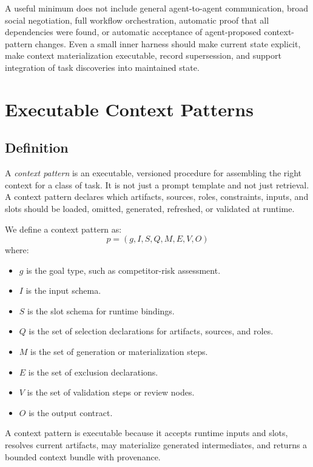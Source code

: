\documentclass{article}
\begin{document}
A useful minimum does not include general agent-to-agent communication, broad social negotiation, full workflow orchestration, automatic proof that all dependencies were found, or automatic acceptance of agent-proposed context-pattern changes. Even a small inner harness should make current state explicit, make context materialization executable, record supersession, and support integration of task discoveries into maintained state.

\section{Executable Context Patterns}

\subsection{Definition}

A \emph{context pattern} is an executable, versioned procedure for assembling the right context for a class of task. It is not just a prompt template and not just retrieval. A context pattern declares which artifacts, sources, roles, constraints, inputs, and slots should be loaded, omitted, generated, refreshed, or validated at runtime.

We define a context pattern as:
\begin{equation}
p = (g, I, S, Q, M, E, V, O)
\end{equation}
where:
\begin{itemize}[leftmargin=*]
\item $g$ is the goal type, such as competitor-risk assessment.
\item $I$ is the input schema.
\item $S$ is the slot schema for runtime bindings.
\item $Q$ is the set of selection declarations for artifacts, sources, and roles.
\item $M$ is the set of generation or materialization steps.
\item $E$ is the set of exclusion declarations.
\item $V$ is the set of validation steps or review nodes.
\item $O$ is the output contract.
\end{itemize}

A context pattern is executable because it accepts runtime inputs and slots, resolves current artifacts, may materialize generated intermediates, and returns a bounded context bundle with provenance.
\end{document}
